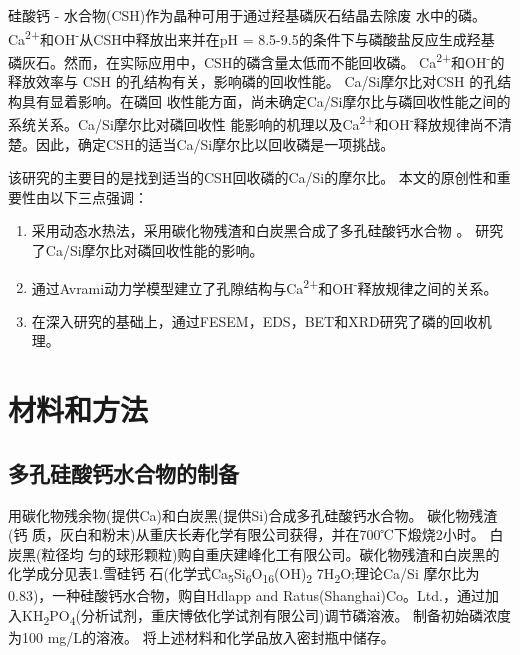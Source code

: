 \documentclass[11pt]{article}
\begin{document}
硅酸钙 - 水合物(CSH)作为晶种可用于通过羟基磷灰石结晶去除废
水中的磷。\cite{battistoni01_phosp_remov_from_real_anaer} Ca\textsuperscript{2+}和OH\textsuperscript{-}从CSH中释放出来并在pH = 8.5-9.5的条件下与磷酸盐反应生成羟基
磷灰石。然而，在实际应用中，CSH的磷含量太低而不能回收磷。
\cite{renman10_long_term_phosp_remov_by,de-bashan04_recen_advan_remov_phosp_from}  Ca\textsuperscript{2+}和OH\textsuperscript{-}的释放效率与
CSH \cite{yin11_phosp_remov_from_wastew_by} 的孔结构有关，影响磷的回收性能。
\cite{westholm06_subst_phosp_remov_poten_benef,baur04_dissol_precip_behav_ettrin_monos}
Ca/Si摩尔比对CSH
\cite{chen04_solub_struc_calcium_silic_hydrat,soyer-uzun11_compos_evolut_calcium_silic_hydrat,richardson04_tober_tober_hydrox_based_model}
的孔结构具有显着影响。在磷回
收性能方面，尚未确定Ca/Si摩尔比与磷回收性能之间的系统关系。Ca/Si摩尔比对磷回收性
能影响的机理以及Ca\textsuperscript{2+}和OH\textsuperscript{-}释放规律尚不清楚。因此，确定CSH的适当Ca/Si摩尔比以回收磷是一项挑战。

该研究的主要目的是找到适当的CSH回收磷的Ca/Si的摩尔比。 本文的原创性和重要性由以下三点强调：
\begin{enumerate}
\item 采用动态水热法，采用碳化物残渣和白炭黑合成了多孔硅酸钙水合物
\cite{li04_format_micro_porous_spher_partic,mansur10_prepar_charac_cytoc_bioac_coatin} 。 研究了Ca/Si摩尔比对磷回收性能的影响。
\item 通过Avrami动力学模型建立了孔隙结构与Ca\textsuperscript{2+}和OH\textsuperscript{-}释放规律之间的关系。
\item 在深入研究的基础上，通过FESEM，EDS，BET和XRD研究了磷的回收机理。
\end{enumerate}

\section{材料和方法}
\label{sec:org09b26ae}
\subsection{多孔硅酸钙水合物的制备}
\label{sec:org66c6a9e}
用碳化物残余物(提供Ca)和白炭黑(提供Si)合成多孔硅酸钙水合物。 碳化物残渣(钙
质，灰白和粉末)从重庆长寿化学有限公司获得，并在700℃下煅烧2小时。 白炭黑(粒径均
匀的球形颗粒)购自重庆建峰化工有限公司。碳化物残渣和白炭黑的化学成分见表1.雪硅钙
石(化学式Ca\textsubscript{5}Si\textsubscript{6}O\textsubscript{16}(OH)\textsubscript{2} \dot 7H\textsubscript{2}O;理论Ca/Si 摩尔比为0.83)，一种硅酸钙水合物，购自Hdlapp and Ratus(Shanghai)Co。Ltd.，通过加入KH\textsubscript{2}PO\textsubscript{4}(分析试剂，重庆博依化学试剂有限公司)调节磷溶液。 制备初始磷浓度为100 mg/L的溶液。 将上述材料和化学品放入密封瓶中储存。
\end{document}
